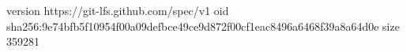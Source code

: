 version https://git-lfs.github.com/spec/v1
oid sha256:9e74bfb5f10954f00a09defbce49ce9d872f00cf1eac8496a6468f39a8a64d0e
size 359281
